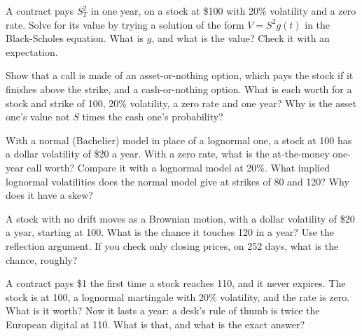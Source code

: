 \begin{question}\label{iq:iv2:pricing-and-numerics:17}
A contract pays $S_T^2$ in one year, on a stock at \$100 with 20\% volatility and a zero rate. Solve for its value by trying a solution of the form $V = S^2 g(t)$ in the Black-Scholes equation. What is $g$, and what is the value? Check it with an expectation.
\end{question}

\begin{question}\label{iq:iv2:pricing-and-numerics:18}
Show that a call is made of an asset-or-nothing option, which pays the stock if it finishes above the strike, and a cash-or-nothing option. What is each worth for a stock and strike of 100, 20\% volatility, a zero rate and one year? Why is the asset one's value not $S$ times the cash one's probability?
\end{question}

\begin{question}\label{iq:iv2:pricing-and-numerics:19}
With a normal (Bachelier) model in place of a lognormal one, a stock at 100 has a dollar volatility of \$20 a year. With a zero rate, what is the at-the-money one-year call worth? Compare it with a lognormal model at 20\%. What implied lognormal volatilities does the normal model give at strikes of 80 and 120? Why does it have a skew?
\end{question}

\begin{question}\label{iq:iv2:pricing-and-numerics:20}
A stock with no drift moves as a Brownian motion, with a dollar volatility of \$20 a year, starting at 100. What is the chance it touches 120 in a year? Use the reflection argument. If you check only closing prices, on 252 days, what is the chance, roughly?
\end{question}

\begin{question}\label{iq:iv2:pricing-and-numerics:21}
A contract pays \$1 the first time a stock reaches 110, and it never expires. The stock is at 100, a lognormal martingale with 20\% volatility, and the rate is zero. What is it worth? Now it lasts a year: a desk's rule of thumb is twice the European digital at 110. What is that, and what is the exact answer?
\end{question}

